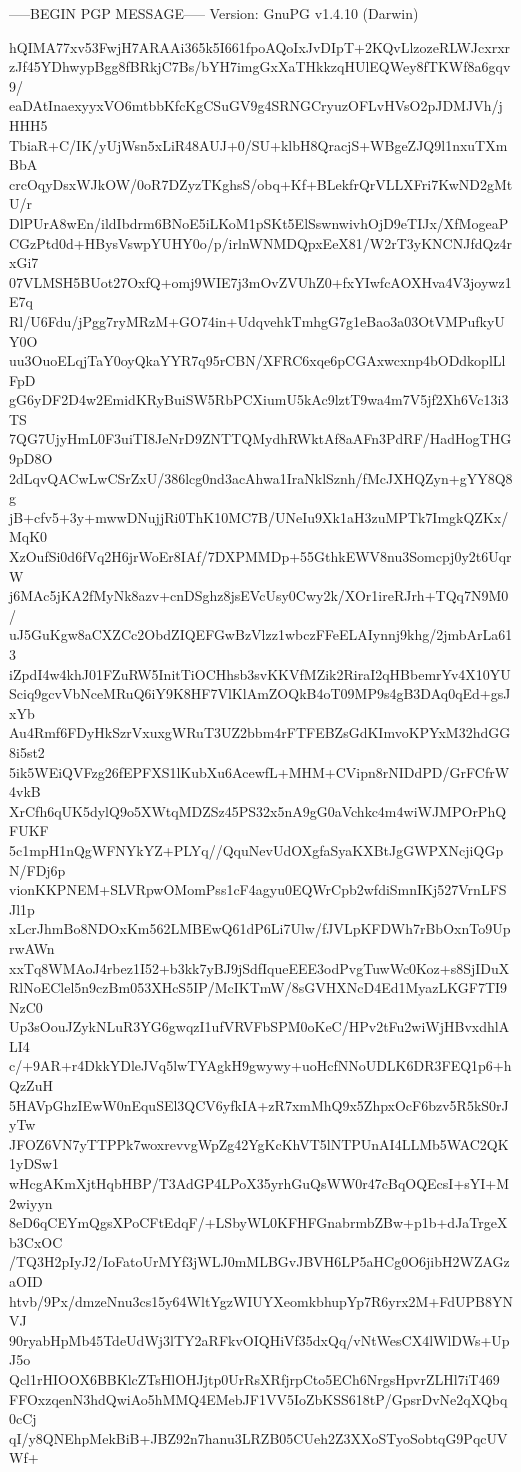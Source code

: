 -----BEGIN PGP MESSAGE-----
Version: GnuPG v1.4.10 (Darwin)

hQIMA77xv53FwjH7ARAAi365k5I661fpoAQoIxJvDIpT+2KQvLlzozeRLWJcxrxr
zJf45YDhwypBgg8fBRkjC7Bs/bYH7imgGxXaTHkkzqHUlEQWey8fTKWf8a6gqv9/
eaDAtInaexyyxVO6mtbbKfcKgCSuGV9g4SRNGCryuzOFLvHVsO2pJDMJVh/jHHH5
TbiaR+C/IK/yUjWsn5xLiR48AUJ+0/SU+klbH8QracjS+WBgeZJQ9l1nxuTXmBbA
crcOqyDsxWJkOW/0oR7DZyzTKghsS/obq+Kf+BLekfrQrVLLXFri7KwND2gMtU/r
DlPUrA8wEn/ildIbdrm6BNoE5iLKoM1pSKt5ElSswnwivhOjD9eTIJx/XfMogeaP
CGzPtd0d+HBysVswpYUHY0o/p/irlnWNMDQpxEeX81/W2rT3yKNCNJfdQz4rxGi7
07VLMSH5BUot27OxfQ+omj9WIE7j3mOvZVUhZ0+fxYIwfcAOXHva4V3joywz1E7q
Rl/U6Fdu/jPgg7ryMRzM+GO74in+UdqvehkTmhgG7g1eBao3a03OtVMPufkyUY0O
uu3OuoELqjTaY0oyQkaYYR7q95rCBN/XFRC6xqe6pCGAxwcxnp4bODdkoplLlFpD
gG6yDF2D4w2EmidKRyBuiSW5RbPCXiumU5kAc9lztT9wa4m7V5jf2Xh6Vc13i3TS
7QG7UjyHmL0F3uiTI8JeNrD9ZNTTQMydhRWktAf8aAFn3PdRF/HadHogTHG9pD8O
2dLqvQACwLwCSrZxU/386lcg0nd3acAhwa1IraNklSznh/fMcJXHQZyn+gYY8Q8g
jB+cfv5+3y+mwwDNujjRi0ThK10MC7B/UNeIu9Xk1aH3zuMPTk7ImgkQZKx/MqK0
XzOufSi0d6fVq2H6jrWoEr8IAf/7DXPMMDp+55GthkEWV8nu3Somcpj0y2t6UqrW
j6MAc5jKA2fMyNk8azv+cnDSghz8jsEVcUsy0Cwy2k/XOr1ireRJrh+TQq7N9M0/
uJ5GuKgw8aCXZCc2ObdZIQEFGwBzVlzz1wbczFFeELAIynnj9khg/2jmbArLa613
iZpdI4w4khJ01FZuRW5InitTiOCHhsb3svKKVfMZik2RiraI2qHBbemrYv4X10YU
Sciq9gcvVbNceMRuQ6iY9K8HF7VlKlAmZOQkB4oT09MP9s4gB3DAq0qEd+gsJxYb
Au4Rmf6FDyHkSzrVxuxgWRuT3UZ2bbm4rFTFEBZsGdKImvoKPYxM32hdGG8i5st2
5ik5WEiQVFzg26fEPFXS1lKubXu6AcewfL+MHM+CVipn8rNIDdPD/GrFCfrW4vkB
XrCfh6qUK5dylQ9o5XWtqMDZSz45PS32x5nA9gG0aVchkc4m4wiWJMPOrPhQFUKF
5c1mpH1nQgWFNYkYZ+PLYq//QquNevUdOXgfaSyaKXBtJgGWPXNcjiQGpN/FDj6p
vionKKPNEM+SLVRpwOMomPss1cF4agyu0EQWrCpb2wfdiSmnIKj527VrnLFSJl1p
xLcrJhmBo8NDOxKm562LMBEwQ61dP6Li7Ulw/fJVLpKFDWh7rBbOxnTo9UprwAWn
xxTq8WMAoJ4rbez1I52+b3kk7yBJ9jSdfIqueEEE3odPvgTuwWc0Koz+s8SjIDuX
RlNoEClel5n9czBm053XHcS5IP/McIKTmW/8sGVHXNcD4Ed1MyazLKGF7TI9NzC0
Up3sOouJZykNLuR3YG6gwqzI1ufVRVFbSPM0oKeC/HPv2tFu2wiWjHBvxdhlALI4
c/+9AR+r4DkkYDleJVq5lwTYAgkH9gwywy+uoHcfNNoUDLK6DR3FEQ1p6+hQzZuH
5HAVpGhzIEwW0nEquSEl3QCV6yfkIA+zR7xmMhQ9x5ZhpxOcF6bzv5R5kS0rJyTw
JFOZ6VN7yTTPPk7woxrevvgWpZg42YgKcKhVT5lNTPUnAI4LLMb5WAC2QK1yDSw1
wHcgAKmXjtHqbHBP/T3AdGP4LPoX35yrhGuQsWW0r47cBqOQEcsI+sYI+M2wiyyn
8eD6qCEYmQgsXPoCFtEdqF/+LSbyWL0KFHFGnabrmbZBw+p1b+dJaTrgeXb3CxOC
/TQ3H2pIyJ2/IoFatoUrMYf3jWLJ0mMLBGvJBVH6LP5aHCg0O6jibH2WZAGzaOID
htvb/9Px/dmzeNnu3cs15y64WltYgzWIUYXeomkbhupYp7R6yrx2M+FdUPB8YNVJ
90ryabHpMb45TdeUdWj3lTY2aRFkvOIQHiVf35dxQq/vNtWesCX4lWlDWs+UpJ5o
Qcl1rHIOOX6BBKlcZTsHlOHJjtp0UrRsXRfjrpCto5ECh6NrgsHpvrZLHl7iT469
FFOxzqenN3hdQwiAo5hMMQ4EMebJF1VV5IoZbKSS618tP/GpsrDvNe2qXQbq0cCj
qI/y8QNEhpMekBiB+JBZ92n7hanu3LRZB05CUeh2Z3XXoSTyoSobtqG9PqcUVWf+
